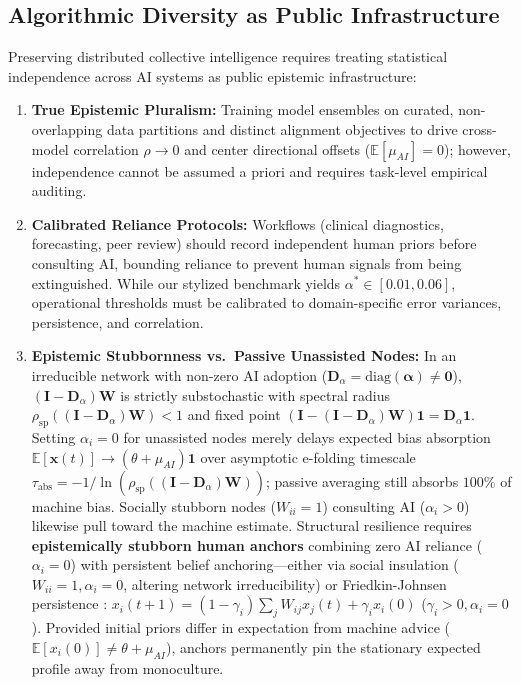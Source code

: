 \documentclass
[letterpaper]{article}
\begin{document}
\subsection{Algorithmic Diversity as Public Infrastructure}
Preserving distributed collective intelligence requires treating statistical independence across AI systems as public epistemic infrastructure:
\begin{enumerate}\setlength{\itemsep}{0pt}\setlength{\parskip}{0pt}\setlength{\parsep}{0pt}
    \item \textbf{True Epistemic Pluralism:} Training model ensembles on curated, non-overlapping data partitions and distinct alignment objectives to drive cross-model correlation $\rho \to 0$ and center directional offsets ($\mathbb{E}[\mu_{AI}] = 0$); however, independence cannot be assumed a priori and requires task-level empirical auditing.
    \item \textbf{Calibrated Reliance Protocols:} Workflows (clinical diagnostics, forecasting, peer review) should record independent human priors before consulting AI, bounding reliance to prevent human signals from being extinguished. While our stylized benchmark yields $\alpha^* \in [0.01, 0.06]$, operational thresholds must be calibrated to domain-specific error variances, persistence, and correlation.
    \item \textbf{Epistemic Stubbornness vs.\ Passive Unassisted Nodes:} In an irreducible network with non-zero AI adoption ($\mathbf{D}_\alpha = \text{diag}(\boldsymbol{\alpha}) \neq \mathbf{0}$), $(\mathbf{I} - \mathbf{D}_\alpha)\mathbf{W}$ is strictly substochastic with spectral radius $\rho_{\text{sp}}((\mathbf{I} - \mathbf{D}_\alpha)\mathbf{W}) < 1$ and fixed point $(\mathbf{I} - (\mathbf{I} - \mathbf{D}_\alpha)\mathbf{W})\mathbf{1} = \mathbf{D}_\alpha\mathbf{1}$. Setting $\alpha_i = 0$ for unassisted nodes merely delays expected bias absorption $\mathbb{E}[\mathbf{x}(t)] \to (\theta + \mu_{AI})\mathbf{1}$ over asymptotic e-folding timescale $\tau_{\text{abs}} = -1 / \ln(\rho_{\text{sp}}((\mathbf{I} - \mathbf{D}_\alpha)\mathbf{W}))$; passive averaging still absorbs $100\%$ of machine bias. Socially stubborn nodes ($W_{ii} = 1$) consulting AI ($\alpha_i > 0$) likewise pull toward the machine estimate. Structural resilience requires \textbf{epistemically stubborn human anchors} combining zero AI reliance ($\alpha_i = 0$) with persistent belief anchoring—either via social insulation ($W_{ii} = 1, \alpha_i = 0$, altering network irreducibility) or Friedkin-Johnsen persistence \citep{friedkin1990social, acemoglu2013opinion}: $x_i(t+1) = (1 - \gamma_i)\sum_j W_{ij} x_j(t) + \gamma_i x_i(0)$ ($\gamma_i > 0, \alpha_i = 0$). Provided initial priors differ in expectation from machine advice ($\mathbb{E}[x_i(0)] \neq \theta + \mu_{AI}$), anchors permanently pin the stationary expected profile away from monoculture.
\end{enumerate}
\end{document}
